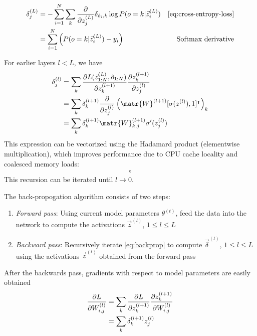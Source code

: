 \begin{align*}
    \delta^{(L)}_{j}
    &= - \sum_{i=1}^{N} \sum_{k} \frac{\pd}{\pd z^{(L)}_j} \delta_{\hat{o}_i,k} \log P(o=k | \vec{z}^{(L)}_i ) &\mbox{\autoref{eq:cross-entropy-loss}} \\
    &= \sum_{i=1}^{N} \left( P(o=k | \vec{z}^{(L)}_i ) - y_i \right) & \mbox{Softmax derivative}
\end{align*}

For earlier layers $l < L$, we have
\begin{align}
    \delta^{(l)}_{j}
    &= \sum_k \frac{\pd L(\vec{z}^{(L)}_{1:N}, \hat{o}_{1:N})}{\pd z^{(l+1)}_k}
    \frac{\pd z^{(l+1)}_k}{\pd z^{(l)}_j}\\
    &= \sum_k \delta^{(l+1)}_k
    \frac{\pd}{\pd z^{(l)}_j} \left( \matr{W}^{(l+1)} [\sigma(z^{(l)}), 1]^\tp \right)_k \\
    &= \sum_k \delta^{(l+1)}_k
    \matr{W}^{(l+1)}_{k,j} \sigma'(z^{(l)}_j) \label{eq:backprop}
\end{align}
This expression can be vectorized using the Hadamard product (elementwise multiplication), which
improves performance due to CPU cache locality and coalesced memory loads: 
\begin{align}
    \circ
\end{align}
This recursion can be iterated until $l \to 0$.

The back-propogation algorithm consists of two steps:
\begin{enumerate}
    \item \emph{Forward pass}: Using current model parameters $\theta^{(t)}$,
        feed the data into the network to compute the activations $\vec{z}^{(l)}$,
        $1 \leq l \leq L$
    \item \emph{Backward pass}: Recursively iterate \autoref{eq:backprop}
        to compute $\vec{\delta}^{(l)}$, $1 \leq l \leq L$ using the activations
        $\vec{z}^{(l)}$ obtained from the forward pass
\end{enumerate}

After the backwards pass, gradients with respect to model parameters are easily obtained
\begin{align}
    \frac{\partial L}{\partial W^{(l)}_{i,j} }
    &= \sum_k \frac{\partial L}{\partial z^{(l+1)}_k} \frac{\partial z^{(l+1)}_k}{\partial W^{(l)}_{i,j}} \\
    &= \sum_k \delta^{(l+1)}_k z^{(l)}_j
\end{align}

